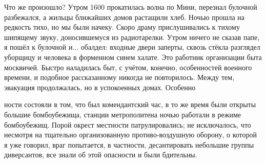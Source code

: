 \label{222-1}
Что же произошло? Утром 1600 прокатилась волна по Мини, перезнал булочной разбежался, а жильцы ближайших домов растащили хлеб. Ночью прошла на редкость тихо, но мы были начеку. Скоро драму прислушивались к тихому шипящему звуку, доносившемуся из радиотарелки. Утром ничего не сказав папе, я пошёл к булочной и... обалдел: входные двери заперты, сквозь стёкла разглядел уборщицу и человека в форменном синем халате. Это работник организации быта москвичей. Быстро наладилась быт, с учётом, конечно, особенностей военного времени, и подобное рассказанному никогда не повторилось. Между тем, эвакуация продолжалась, но в успокоенных домах. Особенно

\label{223-1}
ности состояли в том, что был комендантский час, в то же время были открыты большие бомбоубежища, станции метрополитена ночью работали в режиме бомбоубежищ. Порой окрест местности патрулировались; не исключалось, что несмотря на тщательно организованную противо-воздушную оборону, о которой я уже говорил, враг попытается, в частности, десантировать небольшие группы диверсантов, все знали об этой опасности и были бдительны.
